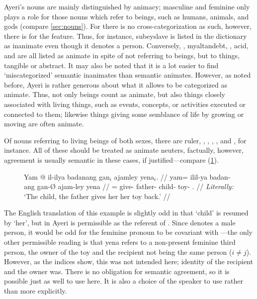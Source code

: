 Ayeri's nouns are mainly distinguished by animacy; masculine and feminine only
plays a role for those nouns which refer to beings, such as humans, animals,
and gods (compare \autoref{sec:nouns}). For \Gend{} there is no
cross-categorization as such, however, there is for the \Anim{} feature. Thus,
for instance,  {subey}{slave} is listed in the dictionary as
inanimate even though it denotes a person. Conversely,
,  {myaltan}{debt},
,  {acid}, and
 are all listed as animate in spite of not referring to
beings, but to things, tangible or abstract. It may also be noted that it is a
lot easier to find `miscategorized' semantic inanimates than semantic animates.
However, as noted before, Ayeri is rather generous about what it allows to be
categorized as animate. Thus, not only beings count as animate, but also things
closely associated with living things, such as events, concepts, or activities
executed or connected to them; likewise things giving some semblance of life
by growing or moving are often animate.

Of nouns referring to living beings of both sexes, there are 
{ruler}, , ,
, , and
, for instance. All of these should be treated as
animate neuters, factually, however, agreement is usually semantic in these
cases, if justified---compare (\ref{ex:childsem}).

\begin{figure}[h]
\ex\label{ex:childsem}\begingl
	\gla Yam @ il-ilya badanang gan$_i$ ajamley yena$_i$. //
	\glb yam= il\til{}il-ya badan-ang gan-Ø ajam-ley yena //
	\glc \DatT{}= \Iter{}\til{}give-\TsgM{} father-\Aarg{} child-\Top{}
		toy-\PargI{} \TsgF{}.\Gen{} //
	\glft \textit{Literally:} `The child, the father gives her her toy 
		back.' //
\endgl\xe
\end{figure}

The English translation of this example is slightly odd in that `child' is
resumed by `her', but in Ayeri  is permissible as the
referent of . Since  denotes a
male person, it would be odd for the feminine pronoun to be covariant with
---the only other permissible reading is that 
{yena} refers to a non-present feminine third person, the owner of the toy and
the recipient not being the same person ($i \neq j$). However, as the indices
show, this was not intended here; identity of the recipient and the owner was.
There is no obligation for semantic agreement, so it is possible just as well
to use  here. It is also a choice of the speaker to use
 rather than  more explicitly.

